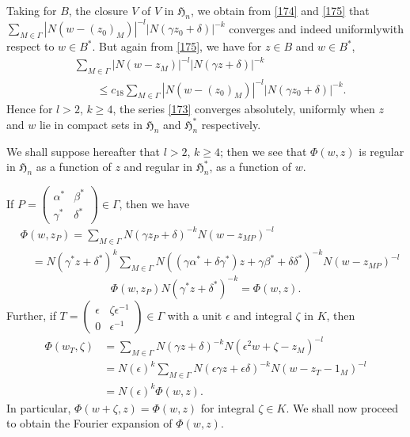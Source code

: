 Taking for $B$, the closure $V$ of $V$ in $\mathfrak{H}_{n}$, we
obtain from \eqref{174} and \eqref{175} that
$\sum\limits_{M\in\Gamma}|N(w-(z_{0})_{M})|^{-l}|N(\gamma
z_{0}+\delta)|^{-k}$ converges and indeed uniformly\pageoriginale with
respect to $w\in B^{\ast}$. But again from \eqref{175}, we have for
$z\in B$ and $w\in B^{\ast}$,
\begin{align*}
& \sum_{M\in\Gamma}|N(w-z_{M})|^{-l}|N(\gamma z+\delta)|^{-k}\\
& \qquad \leq c_{18}\sum_{M\in\Gamma}|N(w-(z_{0})_{M})|^{-l}|N(\gamma
  z_{0}+\delta)|^{-k}.
\end{align*}
Hence for $l>2$, $k\geq 4$, the series \eqref{173} converges
absolutely, uniformly when $z$ and $w$ lie in compact sets in
$\mathfrak{H}_{n}$ and $\mathfrak{H}^{\ast}_{n}$ respectively.

We shall suppose hereafter that $l>2$, $k\geq 4$; then we see that
$\Phi(w,z)$ is regular in $\mathfrak{H}_{n}$ as a function of $z$ and
regular in $\mathfrak{H}^{\ast}_{n}$, as a function of $w$.

If $P=\left(\begin{smallmatrix} \alpha^{\ast} &
  \beta^{\ast}\\ \gamma^{\ast} & \delta^{\ast}
\end{smallmatrix}\right)\in\Gamma$, then we have
\begin{align*}
& \Phi(w,z_{P})=\sum_{M\in\Gamma}N(\gamma
z_{P}+\delta)^{-k}N(w-z_{MP})^{-l}\\
&\quad
= N(\gamma^{\ast}z+\delta^{\ast})^{k}\sum_{M\in\Gamma}N((\gamma\alpha^{\ast}+\delta\gamma^{\ast})z+\gamma\beta^{\ast}+\delta\delta^{\ast})^{-k}N(w-z_{MP})^{-l} 
\end{align*}
\ie
\begin{equation*}
\Phi(w,z_{P})N(\gamma^{\ast}z+\delta^{\ast})^{-k}=\Phi(w,z).\tag{176}\label{176}
\end{equation*}
Further, if $T=\left(\begin{smallmatrix} \epsilon &
  \zeta\epsilon^{-1}\\ 0 & \epsilon^{-1}
\end{smallmatrix}\right)\in\Gamma$ with a unit $\epsilon$ and integral
$\zeta$ in $K$, then
\begin{align*}
\Phi(w_{T},\zeta) &= \sum_{M\in\Gamma}N(\gamma
z+\delta)^{-k}N(\epsilon^{2}w+\zeta-z_{M})^{-l}\\
&= N(\epsilon)^{k}\sum_{M\in\Gamma}N(\epsilon \gamma
z+\epsilon\delta)^{-k}N(w-z_{T}-1_{M})^{-l}\\
&= N(\epsilon)^{k}\Phi(w,z). 
\end{align*}
In particular, $\Phi(w+\zeta,z)=\Phi(w,z)$ for integral $\zeta\in
K$. We shall now proceed to obtain the Fourier expansion of
$\Phi(w,z)$.

